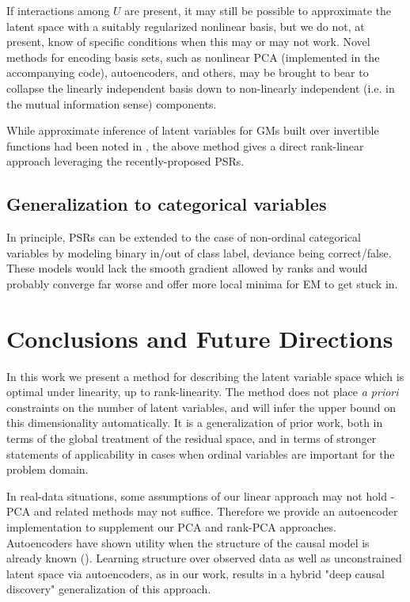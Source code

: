 \documentclass[letterpaper]{article}
\begin{document}
If interactions among $U$ are present, it may still be possible to approximate the latent space with a suitably regularized nonlinear basis, but we do not, at present, know of specific conditions when this may or may not work.  Novel methods for encoding basis sets, such as nonlinear PCA (implemented in the accompanying code), autoencoders, and others, may be brought to bear to collapse the linearly independent basis down to non-linearly independent (i.e. in the mutual information sense) components.

While approximate inference of latent variables for GMs built over invertible functions had been noted in \cite{elidan_ideal_2007}, the above method gives a direct rank-linear approach leveraging the recently-proposed PSRs.

\subsection{Generalization to categorical variables}
In principle, PSRs can be extended to the case of non-ordinal categorical variables by modeling binary in/out of class label, deviance being correct/false.  These models would lack the smooth gradient allowed by ranks and would probably converge far worse and offer more local minima for EM to get stuck in.  

\section{Conclusions and Future Directions}
In this work we present a method for describing the latent variable space which is optimal under linearity, up to rank-linearity.  The method does not place \textit{a priori} constraints on the number of latent variables, and will infer the upper bound on this dimensionality automatically.  It is a generalization of prior work, both in terms of the global treatment of the residual space, and in terms of stronger statements of applicability in cases when ordinal variables are important for the problem domain.  

In real-data situations, some assumptions of our linear approach may not hold - PCA and related methods may not suffice.  Therefore we provide an autoencoder implementation to supplement our PCA and rank-PCA approaches.  Autoencoders have shown utility when the structure of the causal model is already known (\cite{louizos_causal_2017}).  Learning structure over observed data as well as unconstrained latent space via autoencoders, as in our work, results in a hybrid "deep causal discovery" generalization of this approach.  
\end{document}
